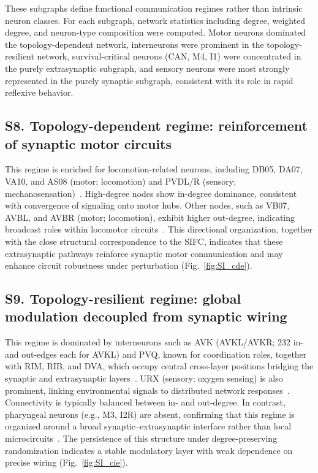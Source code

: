 These subgraphs define functional communication regimes rather than intrinsic neuron
classes. For each subgraph, network statistics including degree, weighted degree, and
neuron-type composition were computed. Motor neurons dominated the topology-dependent
network, interneurons were prominent in the topology-resilient network, survival-critical
neurons (CAN, M4, I1) were concentrated in the purely extrasynaptic subgraph, and sensory
neurons were most strongly represented in the purely synaptic subgraph, consistent with
its role in rapid reflexive behavior.

\subsection*{S8.\; Topology-dependent regime: reinforcement of synaptic motor circuits}

This regime is enriched for locomotion-related neurons, including DB05, DA07, VA10, and
AS08 (motor; locomotion) and PVDL/R (sensory;
mechanosensation)~\cite{wormatlas2023,chatzigeorgiou2010specific}. High-degree nodes show
in-degree dominance, consistent with convergence of signaling onto motor hubs. Other
nodes, such as VB07, AVBL, and AVBR (motor; locomotion), exhibit higher out-degree,
indicating broadcast roles within locomotor circuits~\cite{wormatlas2023,zhen2015}. This
directional organization, together with the close structural correspondence to the SIFC,
indicates that these extrasynaptic pathways reinforce synaptic motor communication and may
enhance circuit robustness under perturbation (Fig.~\ref{fig:SI_cde}).

\subsection*{S9.\; Topology-resilient regime: global modulation decoupled from synaptic
wiring}

This regime is dominated by interneurons such as AVK (AVKL/AVKR; 232 in- and out-edges
each for AVKL) and PVQ, known for coordination roles, together with RIM, RIB, and DVA,
which occupy central cross-layer positions bridging the synaptic and extrasynaptic
layers~\cite{wormatlas2023,ji2023proprioceptive,marquina2024antagonism,wadsworth1996neuroglia,
bentley2016multilayer}. URX (sensory; oxygen sensing) is also prominent, linking
environmental signals to distributed network
responses~\cite{wormatlas2023,cheung2005experience,gray2004oxygen,zimmer2009neurons}.
Connectivity is typically balanced between in- and out-degree. In contrast, pharyngeal
neurons (e.g., M3, I2R) are absent, confirming that this regime is organized around a
broad synaptic--extrasynaptic interface rather than local
microcircuits~\cite{wormatlas2023,dent1997avr}. The persistence of this structure under
degree-preserving randomization indicates a stable modulatory layer with weak dependence
on precise wiring (Fig.~\ref{fig:SI_cie}).

